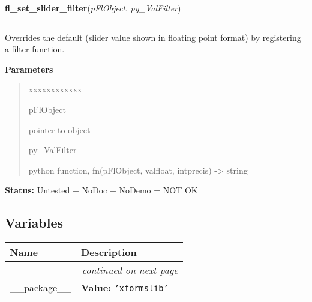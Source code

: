 \hspace{.8\funcindent}\begin{boxedminipage}{\funcwidth}

    \raggedright \textbf{fl\_set\_slider\_filter}(\textit{pFlObject}, \textit{py\_ValFilter})

    \vspace{-1.5ex}

    \rule{\textwidth}{0.5\fboxrule}
\setlength{\parskip}{2ex}
    Overrides the default (slider value shown in floating point format) by 
    registering a filter function.

\setlength{\parskip}{1ex}
      \textbf{Parameters}
      \vspace{-1ex}

      \begin{quote}
        \begin{Ventry}{xxxxxxxxxxxx}

          \item[pFlObject]

          pointer to object

          \item[py\_ValFilter]

          python function, fn(pFlObject, valfloat, intprecis) 
          -{\textgreater} string

        \end{Ventry}

      \end{quote}

\textbf{Status:} Untested + NoDoc + NoDemo = NOT OK



    \end{boxedminipage}



  \subsection{Variables}

    \vspace{-1cm}
\hspace{\varindent}\begin{longtable}{|p{\varnamewidth}|p{\vardescrwidth}|l}
\cline{1-2}
\cline{1-2} \centering \textbf{Name} & \centering \textbf{Description}& \\
\cline{1-2}
\endhead\cline{1-2}\multicolumn{3}{r}{\small\textit{continued on next page}}\\\endfoot\cline{1-2}
\endlastfoot\raggedright \_\-\_\-p\-a\-c\-k\-a\-g\-e\-\_\-\_\- & \raggedright \textbf{Value:} 
{\tt \texttt{'}\texttt{xformslib}\texttt{'}}&\\
\cline{1-2}
\end{longtable}

